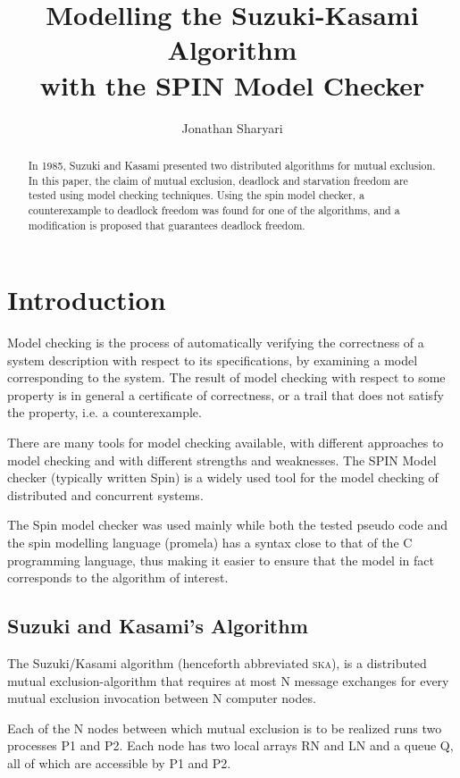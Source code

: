 \documentclass[a4paper,10pt]{llncs}
\title{\textbf{Modelling the Suzuki-Kasami Algorithm\\ with the SPIN Model Checker}}
\author{Jonathan Sharyari}
\institute{Freie Universit{\"a}t Berlin, Computer Science Department\\
Takustra{\ss}e 9. 14195 Berlin, Germany\\
\mailsa
}
\begin{document}
\maketitle


\begin{abstract}
In 1985, Suzuki and Kasami presented two distributed algorithms for mutual exclusion. In this paper, the claim of mutual exclusion, deadlock and starvation freedom are tested using model checking techniques. Using the spin model checker, a counterexample to deadlock freedom was found for one of the algorithms, and a modification is proposed that guarantees deadlock freedom.
\end{abstract}


\section{Introduction}
Model checking is the process of automatically verifying the correctness of a system description with respect to its specifications, by examining a model corresponding to the system. The result of model checking with respect to some property is in general a certificate of correctness, or a trail that does not satisfy the property, i.e. a counterexample.

There are many tools for model checking available, with different approaches to model checking and with different strengths and weaknesses. The SPIN Model checker (typically written Spin) is a widely used tool for the model checking of distributed and concurrent systems.

The Spin model checker was used mainly while both the tested pseudo code and the spin modelling language (promela) has a syntax close to that of the C programming language, thus making it easier to ensure that the model in fact corresponds to the algorithm of interest.


\subsection{Suzuki and Kasami's Algorithm}

The Suzuki/Kasami algorithm\cite{Suzuki} (henceforth abbreviated \textsc{ska}), is a distributed mutual exclusion-algorithm that requires at most N message exchanges for every mutual exclusion invocation between N computer nodes.

Each of the N nodes between which mutual exclusion is to be realized runs two processes P1 and P2. Each node has two local arrays RN and LN and a queue Q, all of which are accessible by P1 and P2.
\end{document}
